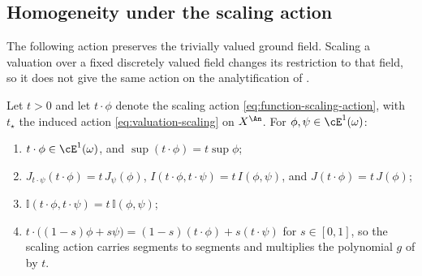 \subsection{Homogeneity under the scaling action}
\label{sec:ch47-scaling}

The following action preserves the trivially valued ground field.
Scaling a valuation over a fixed discretely valued field changes its
restriction to that field, so it does not give the same action on the
analytification of .

\begin{proposition}
\label{prop:ch47-scaling}
Let $t>0$ and let $t\cdot\phi$ denote the scaling action
\eqref{eq:function-scaling-action}, with $t_\star$ the induced action
\eqref{eq:valuation-scaling} on $X^{\An}$.  For
$\phi,\psi\in\cE^1(\omega)$:
\begin{enumerate}
\item\label{itm:ch47-scal:e1}
      $t\cdot\phi\in\cE^1(\omega)$, and
      $\sup(t\cdot\phi)=t\sup\phi$;
\item\label{itm:ch47-scal:JI}
      $J_{t\cdot\psi}(t\cdot\phi)=t\,J_\psi(\phi)$,
      $I(t\cdot\phi,t\cdot\psi)=t\,I(\phi,\psi)$, and
      $J(t\cdot\phi)=t\,J(\phi)$;
\item\label{itm:ch47-scal:quasi}
      $\mathbb I(t\cdot\phi,t\cdot\psi)=t\,\mathbb I(\phi,\psi)$;
\item\label{itm:ch47-scal:segment}
      $t\cdot\bigl((1-s)\phi+s\psi\bigr)=(1-s)(t\cdot\phi)+s(t\cdot\psi)$
      for $s\in[0,1]$, so the scaling action carries segments to segments
      and multiplies the polynomial $g$ of
       by $t$.
\end{enumerate}
\end{proposition}


